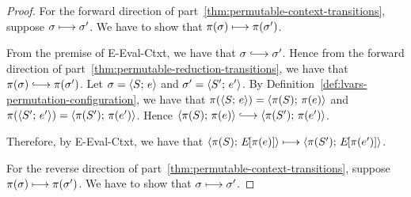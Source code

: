 \begin{proof}
  For the forward direction of
  part~\ref{thm:permutable-context-transitions}, suppose $\sigma
  \longmapsto \sigma'$.  We have to show that $\pi(\sigma) \longmapsto
  \pi(\sigma')$.

  From the premise of {\sc E-Eval-Ctxt}, we have that $\conf
  \parstepsto \conf'$.  Hence from the forward direction of
  part~\ref{thm:permutable-reduction-transitions}, we have that
  $\pi(\conf) \parstepsto \pi(\conf')$.  Let $\sigma = \langle S;\, e \rangle$
  and $\sigma' = \langle S';\, e' \rangle$.  By
  Definition~\ref{def:lvars-permutation-configuration}, we have that
  $\pi(\langle S;\, e \rangle) = \langle \pi(S);\, \pi(e) \rangle$ and
  $\pi(\langle S';\, e' \rangle) = \langle \pi(S');\, \pi(e') \rangle$.  Hence
  $\config{\pi(S)}{\pi(e)} \parstepsto \config{\pi(S')}{\pi(e')}$.

  Therefore, by {\sc E-Eval-Ctxt}, we have that
  $\langle \pi(S);\, E\hspace{-1mm}\left[\pi(e)\right] \rangle \longmapsto
  \langle \pi(S');\, E\hspace{-1mm}\left[\pi(e')\right] \rangle$.


  For the reverse direction of
  part~\ref{thm:permutable-context-transitions}, suppose $\pi(\sigma)
  \longmapsto \pi(\sigma')$.  We have to show that $\sigma \longmapsto
  \sigma'$.

\end{proof}
